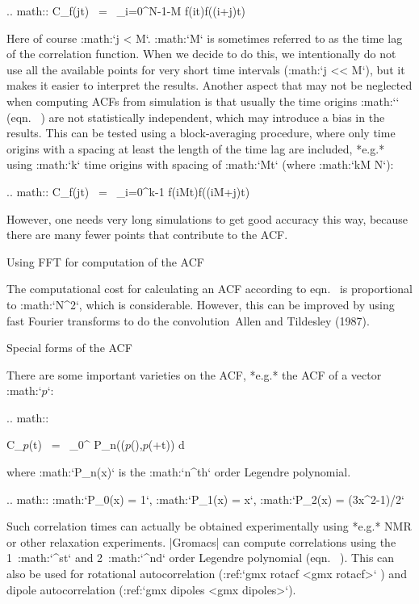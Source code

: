 .. math:: C_f(j\Delta t)  ~=~ \sum_{i=0}^{N-1-M} f(i\Delta t)f((i+j)\Delta t)

Here of course :math:`j < M`. :math:`M` is sometimes referred to as the
time lag
of the correlation function. When
we decide to do this, we intentionally do not use all the available
points for very short time intervals (:math:`j << M`), but it makes it
easier to interpret the results. Another aspect that may not be
neglected when computing ACFs from simulation is that usually the time
origins :math:`\xi` (eqn. 
) are not
statistically independent, which may introduce a bias in the results.
This can be tested using a block-averaging procedure, where only time
origins with a spacing at least the length of the time lag are included,
*e.g.* using :math:`k` time origins with spacing of :math:`M\Delta t`
(where :math:`kM \leq N`):

.. math:: C_f(j\Delta t)  ~=~ \sum_{i=0}^{k-1} f(iM\Delta t)f((iM+j)\Delta t)

However, one needs very long simulations to get good accuracy this way,
because there are many fewer points that contribute to the ACF.

Using FFT for computation of the ACF
~~~~~~~~~~~~~~~~~~~~~~~~~~~~~~~~~~~~

The computational cost for calculating an ACF according to
eqn. 
is proportional to :math:`N^2`, which
is considerable. However, this can be improved by using fast Fourier
transforms to do the convolution Allen and Tildesley (1987).

Special forms of the ACF
~~~~~~~~~~~~~~~~~~~~~~~~

There are some important varieties on the ACF, *e.g.* the ACF of a
vector :math:`{\mbox{\boldmath ${p}$}}`:

.. math::

   C_{{\mbox{\boldmath ${p}$}}}(t) ~=~       \int_0^{\infty} P_n(\cos\angle\left({\mbox{\boldmath ${p}$}}(\xi),{\mbox{\boldmath ${p}$}}(\xi+t)\right) {\rm d} \xi
   \label{eqn:corrleg}

where :math:`P_n(x)` is the :math:`n^{th}` order Legendre
polynomial. 

.. math:: :math:`P_0(x) = 1`, :math:`P_1(x) = x`, :math:`P_2(x) = (3x^2-1)/2`

Such correlation times can actually be obtained
experimentally using *e.g.* NMR or other relaxation experiments. |Gromacs|
can compute correlations using the 1\ :math:`^{st}` and 2\ :math:`^{nd}`
order Legendre polynomial (eqn. 
). This
can also be used for rotational autocorrelation (:ref:`gmx rotacf <gmx rotacf>`
) and dipole autocorrelation
(:ref:`gmx dipoles <gmx dipoles>`).

